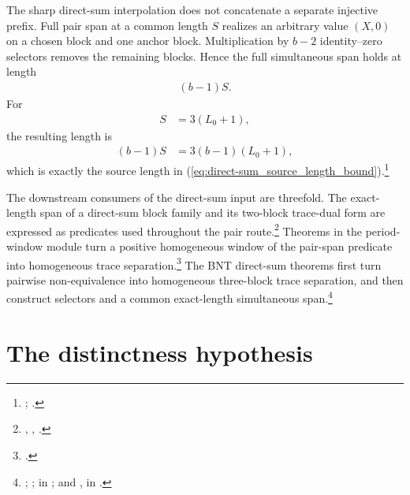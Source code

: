\documentclass{article}
\begin{document}
The sharp direct-sum interpolation does not concatenate a separate injective
prefix. Full pair span at a common length $S$ realizes an arbitrary value
$(X,0)$ on a chosen block and one anchor block. Multiplication by $b-2$
identity--zero selectors removes the remaining blocks. Hence the full
simultaneous span holds at length
\begin{align}
    (b-1)S.
    \label{eq:direct-sum_selector_interpolation_length}
\end{align}
For
\begin{align}
    S
     & =3(L_0+1),
    \label{eq:direct-sum_three_block_pair_length}
\end{align}
the resulting length is
\begin{align}
    (b-1)S
     & =3(b-1)(L_0+1),
    \label{eq:direct-sum_recovered_source_length}
\end{align}
which is exactly the source length in
(\ref{eq:direct-sum_source_length_bound}).\footnote{%
    ;
    .}

The downstream consumers of the direct-sum input are threefold. The
exact-length span of a direct-sum block family and its two-block trace-dual
form are expressed as predicates used throughout the pair route.\footnote{%
    , ,
    .}
Theorems in the period-window module turn a positive homogeneous window of the
pair-span predicate into homogeneous trace separation.\footnote{%
    .}
The BNT direct-sum theorems first turn pairwise non-equivalence into homogeneous
three-block trace separation, and then construct selectors and a common
exact-length simultaneous span.\footnote{%
    ;
    ;
    in ; and
    ,
    in .}

\section{The distinctness hypothesis}
\end{document}
